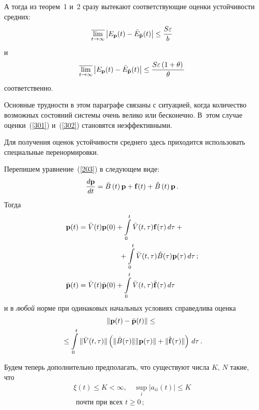 \begin{multicols}{2}
А тогда  из теорем~1 и~2 сразу вытекают соответствующие оценки устойчивости средних:
\begin{equation}
\overline{\lim_{t \to \infty}} \left|E_{\bf p}(t)- \bar{E}_{\bf \bar{p}}(t)\right| \le
\displaystyle\frac{\displaystyle S\varepsilon \mathstrut}{\displaystyle b\mathstrut}
\label{301}
\end{equation}
и
\begin{equation}
\overline{\lim_{t \to \infty}} \left|E_{\bf p}(t)- \bar{E}_{\bf \bar{p}}(t)\right| \le
\displaystyle\frac{\displaystyle S\varepsilon \left( 1+\theta\right)\mathstrut}{\displaystyle \theta\mathstrut}
\label{302}
\end{equation}
соответственно.

\medskip

Основные трудности в этом параграфе связаны с ситуацией, когда количество возможных 
состояний системы очень велико или бесконечно. В~этом случае оценки~(\ref{301}) 
и~(\ref{302}) становятся неэффективными.

Для получения оценок устойчивости среднего здесь приходится использовать 
специальные перенормировки.

Перепишем уравнение~(\ref{203}) в следующем виде:
\begin{equation*}
\displaystyle\frac{\displaystyle d\mathbf {p}\mathstrut}{\displaystyle dt\mathstrut}= \bar{B}\left( t\right) \mathbf {p} + {\bf f}(t) +\hat{B}\left( t\right) \mathbf {p}\,.
\end{equation*}
Тогда
\begin{align*}
\mathbf {p}(t)&=\bar{V}(t)\mathbf {p}(0)+\int\limits_0^t \bar{V}(t,\tau){\bf f}(\tau) \, d\tau+{}\notag\\
&\hspace*{20mm}{}+\int\limits_0^t \bar{V}(t,\tau)\hat{B}(\tau){\bf p}(\tau)\, d\tau\,;
\\
\bar{\mathbf {p}}(t)&=\bar{V}(t)\bar{\mathbf {p}}(0)+\int\limits_0^t \bar{V}(t,\tau)\bar{\bf f}(\tau) \, d\tau 
\end{align*}
и в {\it любой} норме при одинаковых начальных условиях справедлива оценка
\begin{multline}
\left\|\mathbf {p}(t)-\bar{\mathbf {p}}(t)\right\|\le {}\\
{}\le\int\limits_0^t \|\bar{V}(t,\tau)\|
\left(\|\hat{B}(\tau)\|\|{\bf p}(\tau)\| + \|\hat{\bf f}(\tau)\|\right)\, d\tau\,.
\label{306}
\end{multline}

Будем теперь дополнительно предполагать, что существуют числа $K,\,N$ такие, что
\begin{multline}
\xi(t) \le K < \infty,\quad \sup_i |a_{ii}(t)| \le K
\\  \mbox { почти при всех } t \ge 0\,;
\label{307}
\end{multline}


\end{multicols}
